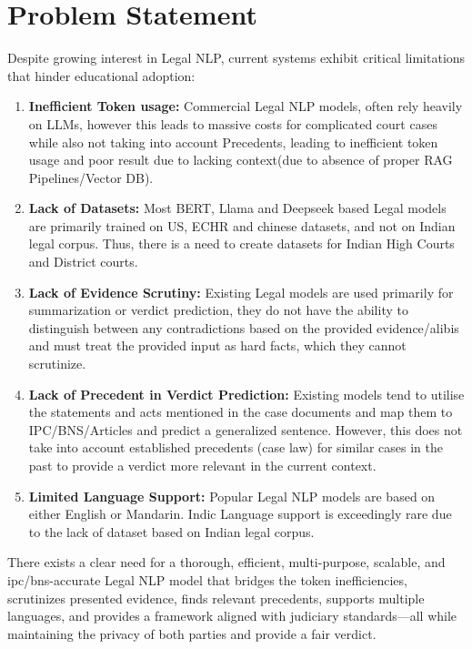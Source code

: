 \pagebreak

\section{Problem Statement}

Despite growing interest in Legal NLP, current systems exhibit critical limitations that hinder educational adoption:

\begin{enumerate}
    \item \textbf{Inefficient Token usage:} Commercial Legal NLP models, often rely heavily on LLMs, however this leads to massive costs for complicated court cases while also not taking into account Precedents, leading to inefficient token usage and poor result due to lacking context(due to absence of proper RAG Pipelines/Vector DB).
    
    \item \textbf{Lack of Datasets:} Most BERT, Llama and Deepseek based Legal models are primarily trained on US, ECHR and chinese  datasets, and not on Indian legal corpus. Thus, there is a need to create datasets for Indian High Courts and District courts.
    
    \item \textbf{Lack of Evidence Scrutiny:} Existing Legal models are used primarily for summarization or verdict prediction, they do not have the ability to distinguish between any contradictions based on the provided evidence/alibis and must treat the provided input as hard facts, which they cannot scrutinize.
    
    \item \textbf{Lack of Precedent in Verdict Prediction:} Existing models tend to utilise the statements and acts mentioned in the case documents and map them to IPC/BNS/Articles and predict a generalized sentence. However, this does not take into account established precedents (case law) for similar cases in the past to provide a verdict more relevant in the current context.
    
    \item \textbf{Limited Language Support:} Popular Legal NLP models are based on either English or Mandarin. Indic Language support is exceedingly rare due to the lack of dataset based on Indian legal corpus.
\end{enumerate}

There exists a clear need for a thorough, efficient, multi-purpose, scalable, and ipc/bns-accurate Legal NLP model that bridges the token inefficiencies, scrutinizes presented evidence, finds relevant precedents, supports multiple languages, and provides a framework aligned with judiciary standards—all while maintaining the privacy of both parties and provide a fair verdict.


